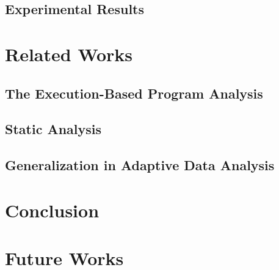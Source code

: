 \documentclass[12pt, letterpaper]{report}   %
\begin{document}
\section{Experimental Results}
\label{sec:adapt-eval}


\chapter{Related Works}
\label{sec:adapt-relatedwork}

\section{The Execution-Based Program Analysis}
\label{sec:relatedwork-exe}



\section{Static Analysis}
\label{sec:relatedwork-static}


\section{Generalization in Adaptive Data Analysis}
\label{sec:relatedwork-adapt}


\chapter*{}



\chapter{Conclusion}
\label{sec:conclusion}

\clearpage
%
\chapter{Future Works}
\label{sec:future}
\end{document}
